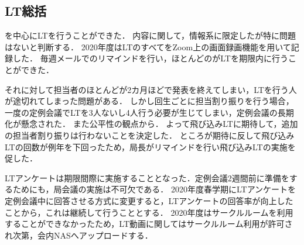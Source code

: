 \subsection*{LT総括}


\firstGrade{}を中心にLTを行うことができた．
内容に関して，情報系に限定したが特に問題はないと判断する．
2020年度はLTのすべてをZoom上の画面録画機能を用いて記録した．
毎週メールでのリマインドを行い，ほとんどの\firstGrade{}がLTを期限内に行うことができた．

それに対して\firstGrade{}担当者のほとんどが2カ月ほどで発表を終えてしまい，LTを行う人が途切れてしまった問題がある．
しかし回生ごとに担当割り振りを行う場合，一度の定例会議でLTを3人ないし4人行う必要が生じてしまい，定例会議の長期化が懸念された．
また公平性の観点から．
よって飛び込みLTに期待して，追加の担当者割り振りは行わないことを決定した．
ところが期待に反して飛び込みLTの回数が例年を下回ったため，局長がリマインドを行い飛び込みLTの実施を促した．

LTアンケートは期限間際に実施することとなった．定例会議2週間前に準備をするためにも，局会議の実施は不可欠である．
2020年度春学期にLTアンケートを定例会議中に回答させる方式に変更すると，LTアンケートの回答率が向上したことから，これは継続して行うこととする．
2020年度はサークルルームを利用することができなかったため，LT動画に関してはサークルルーム利用が許可され次第，会内NASへアップロードする．
